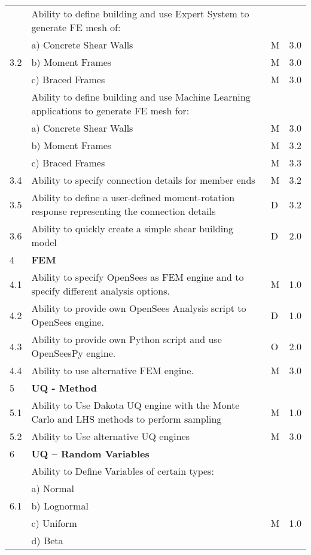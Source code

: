 {\begin{longtable}{| p{} | p{} | p{} | p{} |}
	\multirow{5}{*}{3.2}  & Ability to define building and use Expert System to generate FE mesh of: &  &  \\
	 & a)     Concrete Shear Walls & M & 3.0 \\ 
	 & b)     Moment Frames & M & 3.0 \\ 
	 & c)     Braced Frames & M & 3.0  \\ \hline
	\multirow{5}{*}{3.3} & Ability to define building and use Machine Learning applications to generate FE mesh for: &  &  \\ 
	 & a)     Concrete Shear Walls & M & 3.0 \\ 
	 & b)     Moment Frames & M & 3.2 \\ 
	 & c)     Braced Frames & M & 3.3  \\ \hline
	3.4 & Ability to specify connection details for member ends & M & 3.2 \\ \hline
	3.5 & Ability to define a user-defined moment-rotation response representing the connection details & D & 3.2 \\ \hline
	3.6 & Ability to quickly create a simple shear building model & D & 2.0 \\ \hline
	4 & \textbf{FEM} &  &  \\ \hline
	4.1 & Ability to specify OpenSees as FEM engine and to specify different analysis options. & M & 1.0 \\ \hline
	4.2 & Ability to provide own OpenSees Analysis script to OpenSees engine. & D & 1.0 \\ \hline
	4.3 & Ability to provide own Python script and use OpenSeesPy engine. & O & 2.0 \\ \hline
	4.4 & Ability to use alternative FEM engine. & M & 3.0 \\ \hline
	5 & \textbf{UQ - Method} &  &  \\ \hline
	5.1 & Ability to Use Dakota UQ engine with the Monte Carlo and LHS methods to perform sampling & M & 1.0 \\ \hline
	5.2 & Ability to Use alternative UQ engines & M & 3.0 \\ \hline
    6 & \textbf{UQ – Random Variables} &  &  \\ \hline
	\multirow{5}{*}{6.1} & Ability to Define Variables of certain types: &  &  \\ 
	 & a)     Normal &  &  \\ 
	 & b)     Lognormal &  &  \\ 
	 & c)     Uniform & M  & 1.0 \\ 
	 & d)     Beta &  &  \\ 

\end{longtable}}
